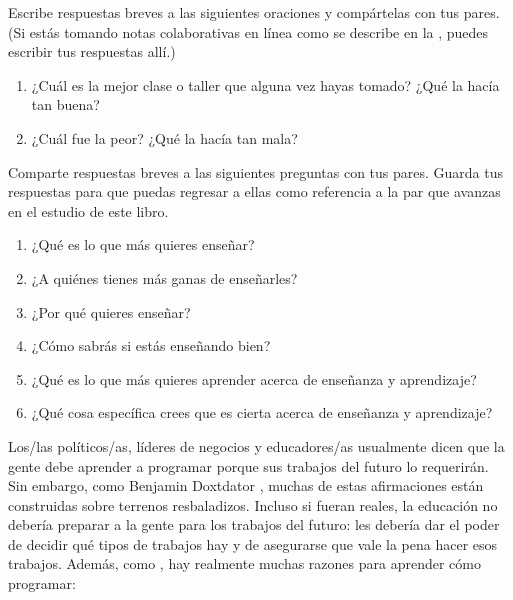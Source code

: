
Escribe respuestas breves a las siguientes oraciones y compártelas con tus pares.
(Si estás tomando notas colaborativas en línea como se describe en la , puedes escribir tus respuestas allí.)

\begin{enumerate}

\item
  ¿Cuál es la mejor clase o taller que alguna vez hayas tomado?
  ¿Qué la hacía tan buena?

\item
  ¿Cuál fue la peor? 
 ¿Qué la hacía tan mala?

\end{enumerate}


Comparte respuestas breves a las siguientes preguntas con tus pares.
Guarda tus respuestas para que puedas regresar a ellas como referencia
a la par que avanzas en el estudio de este libro. 

\begin{enumerate}

\item
  ¿Qué es lo que más quieres enseñar?

\item
  ¿A quiénes tienes más ganas de enseñarles?

\item
  ¿Por qué quieres enseñar?

\item
  ¿Cómo sabrás si estás enseñando bien?

\item
  ¿Qué es lo que más quieres aprender acerca de enseñanza y aprendizaje? 

\item
  ¿Qué cosa específica crees que es cierta acerca de enseñanza y aprendizaje?

\end{enumerate}


Los/las políticos/as, líderes de negocios y educadores/as usualmente dicen que
la gente debe aprender a programar porque sus trabajos del futuro lo requerirán.
Sin embargo,
como Benjamin Doxtdator
,
muchas de estas afirmaciones están construidas sobre terrenos resbaladizos.
Incluso si fueran reales, la educación no debería preparar a la gente para los trabajos del futuro:
les debería dar el poder de decidir qué tipos de trabajos hay y de asegurarse que vale la pena hacer esos trabajos.
Además, como ,
hay realmente muchas razones para aprender cómo programar:

